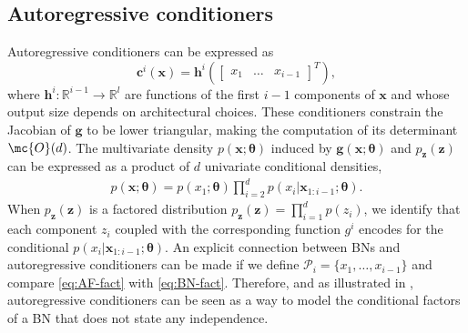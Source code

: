 \subsection{Autoregressive conditioners}
Autoregressive conditioners can be expressed as
$$\mathbf{c}^i(\mathbf{x}) = \mathbf{h}^i\left(\begin{bmatrix} x_1 & \hdots & x_{i-1} \end{bmatrix}^T\right),$$ where $\mathbf{h}^i: \mathbb{R}^{i-1} \rightarrow \mathbb{R}^l$ are functions of the first $i-1$ components of $\mathbf{x}$ and whose output size depends on architectural choices.
These conditioners constrain the Jacobian of $\mathbf{g}$ to be lower triangular, making the computation of its determinant $\mc{O}(d)$.
The multivariate density $p(\mathbf{x}; \mathbf{\theta})$ induced by $\mathbf{g}(\mathbf{x};\mathbf{\theta})$ and $p_{\mathbf{z}}(\mathbf{z})$ can be expressed as a product of $d$ univariate conditional densities,
\begin{align}
    p(\mathbf{x}; \mathbf{\theta}) = p(x_1; \mathbf{\theta})\prod^{d}_{i=2}p(x_{i}|\mathbf{x}_{1:i-1}; \mathbf{\theta}). \label{eq:AF-fact}
\end{align}
When $p_{\mathbf{z}}(\mathbf{z})$ is a factored distribution $p_{\mathbf{z}}(\mathbf{z}) = \prod^{d}_{i=1}p(z_i)$, we identify that each component $z_i$ coupled with the corresponding function $g^i$ encodes for the conditional $p(x_{i}|\mathbf{x}_{1:i-1}; \mathbf{\theta})$.
An explicit connection between BNs and autoregressive conditioners can be made if we define $\mathcal{P}_i = \{x_1, \hdots, x_{i-1}\}$ and compare \eqref{eq:AF-fact} with \eqref{eq:BN-fact}.  Therefore, and as illustrated in , autoregressive conditioners can be seen as a way to model the conditional factors of a BN that does not state any independence.
